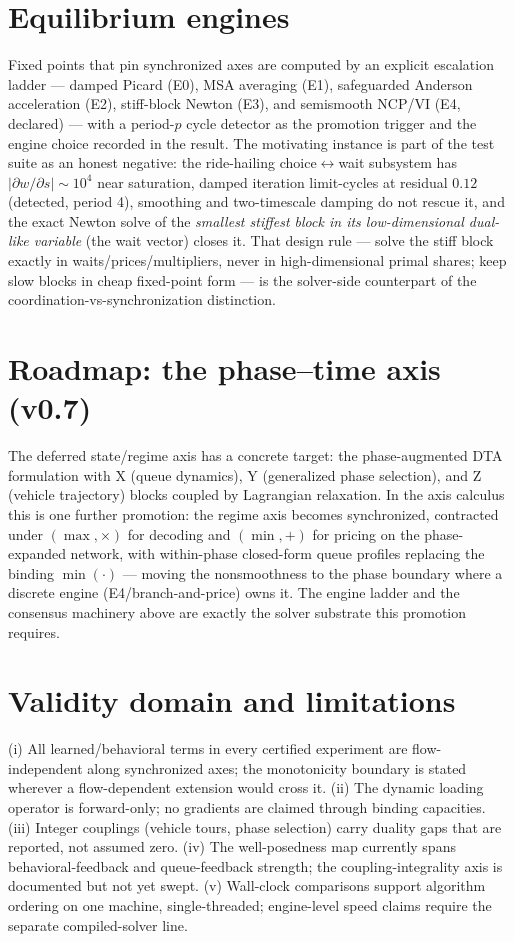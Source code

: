 \documentclass[11pt]{article}
\begin{document}
\section{Equilibrium engines}

Fixed points that pin synchronized axes are computed by an explicit
escalation ladder --- damped Picard (E0), MSA averaging (E1),
safeguarded Anderson acceleration (E2), stiff-block Newton (E3), and
semismooth NCP/VI (E4, declared) --- with a period-$p$ cycle detector
as the promotion trigger and the engine choice recorded in the result.
The motivating instance is part of the test suite as an honest
negative: the ride-hailing choice$\leftrightarrow$wait subsystem has
$|\partial w / \partial s| \sim 10^4$ near saturation, damped iteration
limit-cycles at residual $0.12$ (detected, period 4), smoothing and
two-timescale damping do not rescue it, and the exact Newton solve of
the \emph{smallest stiffest block in its low-dimensional dual-like
variable} (the wait vector) closes it. That design rule --- solve the
stiff block exactly in waits/prices/multipliers, never in
high-dimensional primal shares; keep slow blocks in cheap fixed-point
form --- is the solver-side counterpart of the
coordination-vs-synchronization distinction.

\section{Roadmap: the phase--time axis (v0.7)}

The deferred state/regime axis has a concrete target: the
phase-augmented DTA formulation with X (queue dynamics), Y (generalized
phase selection), and Z (vehicle trajectory) blocks coupled by
Lagrangian relaxation. In the axis calculus this is one further
promotion: the regime axis becomes synchronized, contracted under
$(\max,\times)$ for decoding and $(\min,+)$ for pricing on the
phase-expanded network, with within-phase closed-form queue profiles
replacing the binding $\min(\cdot)$ --- moving the nonsmoothness to the
phase boundary where a discrete engine (E4/branch-and-price) owns it.
The engine ladder and the consensus machinery above are exactly the
solver substrate this promotion requires.

\section{Validity domain and limitations}

(i) All learned/behavioral terms in every certified experiment are
flow-independent along synchronized axes; the monotonicity boundary is
stated wherever a flow-dependent extension would cross it.
(ii) The dynamic loading operator is forward-only; no gradients are
claimed through binding capacities.
(iii) Integer couplings (vehicle tours, phase selection) carry duality
gaps that are reported, not assumed zero.
(iv) The well-posedness map currently spans behavioral-feedback and
queue-feedback strength; the coupling-integrality axis is documented
but not yet swept.
(v) Wall-clock comparisons support algorithm ordering on one machine,
single-threaded; engine-level speed claims require the separate
compiled-solver line.
\end{document}
